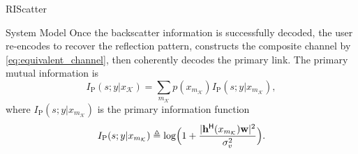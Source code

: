 \begin{section}{RIScatter}
\begin{subsection}{System Model}
		Once the backscatter information is successfully decoded, the user re-encodes to recover the reflection pattern, constructs the composite channel by \eqref{eq:equivalent_channel}, then coherently decodes the primary link.
		The primary mutual information is
		\begin{equation}
			I_{\text{P}}(s;y|x_{\mathcal{K}}) = \sum_{m_{\mathcal{K}}} p(x_{m_{\mathcal{K}}}) I_{\text{P}}(s;y|x_{m_{\mathcal{K}}}),
			\label{eq:primary_mutual_information}
		\end{equation}
		where $I_{\text{P}}(s;y|x_{m_{\mathcal{K}}})$ is the primary information function
		\begin{equation}
			I_{\text{P}}(s;y|x_{m_{\mathcal{K}}}) \triangleq \log \Bigl(1 + \frac{\lvert \mathbf{h}^\mathsf{H}(x_{m_{\mathcal{K}}}) \mathbf{w} \rvert^2}{\sigma_v^2}\Bigr).
			\label{eq:primary_information_function}
		\end{equation}
	\end{subsection}
\end{section}


